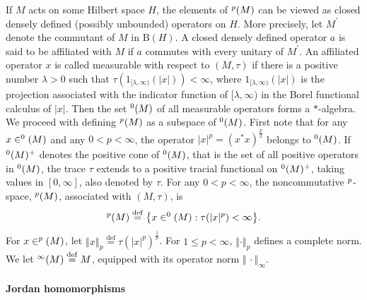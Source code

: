 \documentclass[leqno]{article} %
\newcommand{\B}{\mathrm{B}}
\let\L\relax
\newcommand{\L}{\mathrm{L}}
\renewcommand{\leq}{\ensuremath{\leqslant}}
\renewcommand{\geq}{\ensuremath{\geqslant}}
\newcommand{\norm}[1]{\left\Vert#1\right\Vert}
\newcommand{\co}{\colon}
\newcommand{\ov}{\overset}
\numberwithin{equation}{section}
\begin{document}
If $M$ acts on some Hilbert space $H$, the elements of $\L^p(M)$ can be viewed as closed densely defined (possibly unbounded) operators on $H$. More precisely, let $M^{\prime}$ denote the commutant of $M$ in $\B(H)$. A closed densely defined operator $a$ is said to be affiliated with $M$ if $a$ commutes with every unitary of $M^{\prime}$. An affiliated operator $x$ is called measurable with respect to $(M,\tau)$ if there is a positive number $\lambda > 0$ such that $\tau(1_{[\lambda,\infty)}(|x|))<\infty$, where $1_{[\lambda,\infty)}(|x|)$ is the projection associated with the indicator function of $[\lambda,\infty)$ in the Borel functional calculus of $|x|$. Then the set $\L^0(M)$ of all measurable operators forms a $*$-algebra. We proceed with defining $\L^p(M)$ as a subspace of $\L^0(M)$. First note that for any $x \in \L^0(M)$ and any $0 < p < \infty$, the operator $|x|^p=(x^* x)^{\frac{p}{2}}$ belongs to $\L^0(M)$. If $\L^0(M)^+$ denotes the positive cone of $\L^0(M)$, that is the set of all positive operators in $\L^0(M)$, the trace $\tau$ extends to a positive tracial functional on $\L^0(M)^+$, taking values in $[0,\infty]$, also denoted by $\tau$. For any $0< p < \infty$, the noncommutative $\L^p$-space, $\L^p(M)$, associated with $(M,\tau)$, is
$$
\L^p(M)
\ov{\mathrm{def}}{=} \bigl\{x \in \L^0(M) : \tau(|x|^p) < \infty \bigr\}.
$$
For $x \in \L^p(M)$, let $\norm{x}_p \ov{\mathrm{def}}{=} \tau(|x|^p)^{\frac{1}{p}}$. For $1 \leq p < \infty$, $\norm{\cdot}_p$ defines a complete norm. We let $\L^\infty(M) \ov{\mathrm{def}}{=} M$, equipped with its operator norm $\norm{\,\cdotp}_\infty$.


\paragraph{Jordan homomorphisms} 
\end{document}
